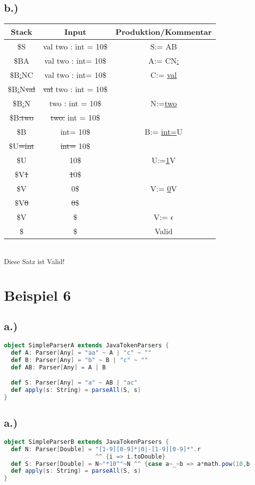 \documentclass[12pt,runningheads,a4paper]{llncs}
\begin{document}
 \subsection*{b.)}
\begin{tabular}{ |c|c|c|  }

 \hline
 Stack&Input &Produktion/Kommentar\\ 
 \hline
 \$S &val two : int = 10\$ &S:= AB \\
  \hline
 \$BA &val two : int= 10\$ &A:= CN\underline{:}\\
 \hline
 \$B\underline{:}NC &val two : int= 10\$ &C:= \underline{val}\\
 \hline
 \$B\underline{:}N\st{val} &\st{val} two : int = 10\$ &\\
   \hline
 \$B\underline{:}N &two : int = 10\$ &N:=\underline{two} \\
   \hline
 \$B\st{:}\st{two} &\st{two}\st{:} int = 10\$ & \\
   \hline
 \$B &int= 10\$ & B:= \underline{int}\underline{=}U \\
   \hline
 \$U\st{=}\st{int} &\st{int}\st{=} 10\$ & \\
   \hline
 \$U  &10\$ & U:=\underline{1}V \\
   \hline
 \$V\st{1} &\st{1}0\$ &\\
   \hline
 \$V &0\$ &V:= \underline{0}V\\
   \hline
 \$V\st{0}  &\st{0}\$ & \\
   \hline
 \$V  &\$  &V:= $\epsilon$\\
   \hline
 \$ &\$ &Valid \\
 \hline

 \end{tabular}\\
Diese Satz ist Valid!
\\


\section*{Beispiel 6}
\subsection*{a.)}
\begin{lstlisting}[language=scala]
object SimpleParserA extends JavaTokenParsers {
  def A: Parser[Any] = "aa" ~ A | "c" ~ ""
  def B: Parser[Any] = "b" ~ B | "c" ~ ""
  def AB: Parser[Any] = A | B

  def S: Parser[Any] = "a" ~ AB | "ac"
  def apply(s: String) = parseAll(S, s)
}
\end{lstlisting}
\subsection*{a.)}
\begin{lstlisting}[language=scala]
object SimpleParserB extends JavaTokenParsers {
  def N: Parser[Double] = "[1-9][0-9]*|0|-[1-9][0-9]*".r 
                          ^^ {i => i.toDouble}
  def S: Parser[Double] = N~"*10^"~N ^^ {case a~_~b => a*math.pow(10,b)}
  def apply(s: String) = parseAll(S, s)
}
\end{lstlisting}
\end{document}

